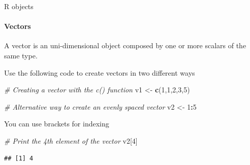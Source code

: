 \documentclass[ignorenonframetext,]{beamer}
\newenvironment{Shaded}{\begin{snugshade}}{\end{snugshade}}
\newcommand{\KeywordTok}[1]{\textcolor[rgb]{0.13,0.29,0.53}{\textbf{#1}}}
\newcommand{\DecValTok}[1]{\textcolor[rgb]{0.00,0.00,0.81}{#1}}
\newcommand{\StringTok}[1]{\textcolor[rgb]{0.31,0.60,0.02}{#1}}
\newcommand{\CommentTok}[1]{\textcolor[rgb]{0.56,0.35,0.01}{\textit{#1}}}
\newcommand{\OperatorTok}[1]{\textcolor[rgb]{0.81,0.36,0.00}{\textbf{#1}}}
\newcommand{\NormalTok}[1]{#1}
\begin{document}
\begin{frame}[fragile]{R objects}

\framesubtitle{Vectors}

A vector is an uni-dimensional object composed by one or more scalars of
the same type.

\begin{block}{Use the following code to create vectors in two different
ways}

\begin{Shaded}
\begin{Highlighting}[]
\CommentTok{# Creating a vector with the c() function}
\NormalTok{v1 <-}\StringTok{ }\KeywordTok{c}\NormalTok{(}\DecValTok{1}\NormalTok{,}\DecValTok{1}\NormalTok{,}\DecValTok{2}\NormalTok{,}\DecValTok{3}\NormalTok{,}\DecValTok{5}\NormalTok{)}

\CommentTok{# Alternative way to create an evenly spaced vector}
\NormalTok{v2 <-}\StringTok{ }\DecValTok{1}\OperatorTok{:}\DecValTok{5}
\end{Highlighting}
\end{Shaded}

\end{block}

\begin{block}{You can use brackets for indexing}

\begin{Shaded}
\begin{Highlighting}[]
\CommentTok{# Print the 4th element of the vector}
\NormalTok{v2[}\DecValTok{4}\NormalTok{]}
\end{Highlighting}
\end{Shaded}

\begin{verbatim}
## [1] 4
\end{verbatim}

\end{block}

\end{frame}
\end{document}
